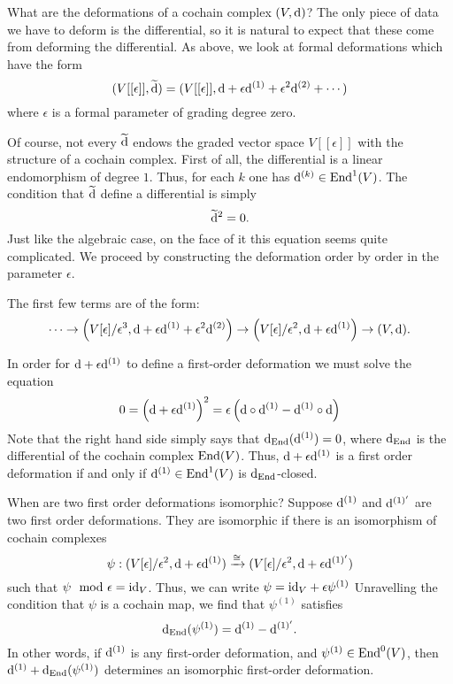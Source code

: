 \documentclass[11pt]{amsart}
\begin{document}
\subsubsection{}

What are the deformations of a cochain complex $(V,{\rm d})$? 
The only piece of data we have to deform is the differential, so it is natural to expect that these come from deforming the differential.
As above, we look at formal deformations which have the form
\[
(V[[\epsilon]], \widetilde{{\rm d}}) = (V [[\epsilon]] , {\rm d} + \epsilon {\rm d}^{(1)} + \epsilon^2 {\rm d}^{(2)} + \cdots) 
\]
where $\epsilon$ is a formal parameter of grading degree zero. 

Of course, not every $\widetilde{{\rm d}}$ endows the graded vector space $V[[\epsilon]]$ with the structure of a cochain complex.
First of all, the differential is a linear endomorphism of degree $1$.
Thus, for each $k$ one has ${\rm d}^{(k)} \in {\rm End}^1(V)$.
The condition that $\widetilde{{\rm d}}$ define a differential is simply
\[
\widetilde{{\rm d}}^2 = 0 .
\] 
Just like the algebraic case, on the face of it this equation seems quite complicated. 
We proceed by constructing the deformation order by order in the parameter $\epsilon$. 

The first few terms are of the form:
\[
\cdots \to \left(V[\epsilon] / \epsilon^3, {\rm d} + \epsilon {\rm d}^{(1)} + \epsilon^2 {\rm d}^{(2)}\right) \to \left(V[\epsilon] / \epsilon^2 , {\rm d} + \epsilon {\rm d}^{(1)} \right) \to (V, {\rm d}) .
\] 

In order for ${\rm d} + \epsilon {\rm d}^{(1)}$ to define a first-order deformation we must solve the equation 
\[
0 = \left({\rm d} + \epsilon {\rm d}^{(1)}\right)^2 = \epsilon \left({\rm d} \circ {\rm d}^{(1)} - {\rm d}^{(1)} \circ {\rm d}\right)
\]
Note that the right hand side simply says that ${\rm d}_{\rm End} ({\rm d}^{(1)}) = 0$, where ${\rm d}_{\rm End}$ is the differential of the cochain complex ${\rm End}(V)$.
Thus, ${\rm d} + \epsilon {\rm d}^{(1)}$ is a first order deformation if and only if ${\rm d}^{(1)} \in {\rm End}^1(V)$ is ${\rm d}_{\rm End}$-closed. 

When are two first order deformations isomorphic?
Suppose ${\rm d}^{(1)}$ and ${\rm d}^{(1)'}$ are two first order deformations. 
They are isomorphic if there is an isomorphism of cochain complexes
\[
\psi : (V[\epsilon]/\epsilon^2 , {\rm d} + \epsilon {\rm d}^{(1)}) \xrightarrow{\cong} (V[\epsilon]/\epsilon^2, {\rm d} + \epsilon {\rm d}^{(1)'})
\]
such that $\psi \mod \epsilon = {\rm id}_V$. 
Thus, we can write $\psi = {\rm id}_V + \epsilon \psi^{(1)}$ 
Unravelling the condition that $\psi$ is a cochain map, we find that $\psi^{(1)}$ satisfies 
\[
{\rm d}_{\rm End} (\psi^{(1)}) = {\rm d}^{(1)} - {\rm d}^{(1)'} .
\] 
In other words, if ${\rm d}^{(1)}$ is any first-order deformation, and $\psi^{(1)} \in {\rm End}^0(V)$, then ${\rm d}^{(1)} + {\rm d}_{\rm End}(\psi^{(1)})$ determines an isomorphic first-order deformation. 
\end{document}
